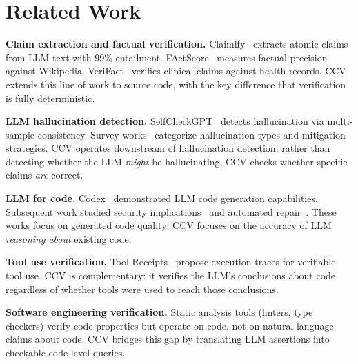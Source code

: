 \section{Related Work}
\label{sec:related}

\textbf{Claim extraction and factual verification.} Claimify~\cite{metropolitansky2025claimify} extracts atomic claims from LLM text with 99\% entailment. FActScore~\cite{min2023factscore} measures factual precision against Wikipedia. VeriFact~\cite{wei2024verifact} verifies clinical claims against health records. CCV extends this line of work to source code, with the key difference that verification is fully deterministic.

\textbf{LLM hallucination detection.} SelfCheckGPT~\cite{jiang2023selfcheck} detects hallucination via multi-sample consistency. Survey works~\cite{ji2023hallucination, zhang2023siren, liu2023trustworthy} categorize hallucination types and mitigation strategies. CCV operates downstream of hallucination detection: rather than detecting whether the LLM \emph{might} be hallucinating, CCV checks whether specific claims \emph{are} correct.

\textbf{LLM for code.} Codex~\cite{chen2021codex} demonstrated LLM code generation capabilities. Subsequent work studied security implications~\cite{pearce2022security} and automated repair~\cite{fan2023automated}. These works focus on generated code quality; CCV focuses on the accuracy of LLM \emph{reasoning about} existing code.

\textbf{Tool use verification.} Tool Receipts~\cite{wang2024toolreceipts} propose execution traces for verifiable tool use. CCV is complementary: it verifies the LLM's conclusions about code regardless of whether tools were used to reach those conclusions.

\textbf{Software engineering verification.} Static analysis tools (linters, type checkers) verify code properties but operate on code, not on natural language claims about code. CCV bridges this gap by translating LLM assertions into checkable code-level queries.
